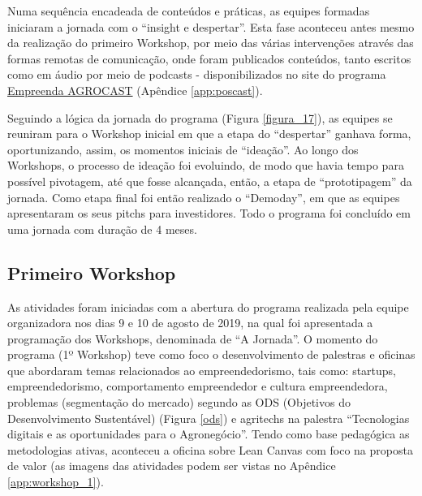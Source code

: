 Numa sequência encadeada de conteúdos e práticas, as equipes formadas iniciaram a jornada com o “insight e despertar”. Esta fase aconteceu antes mesmo da realização do primeiro Workshop, por meio das várias intervenções através das formas remotas de comunicação, onde foram publicados conteúdos, tanto escritos como em áudio por meio de podcasts - disponibilizados no site do programa \href{https://open.spotify.com/show/3c25hRSxvaCFPw6Y3lX3i1?si=9H_fGz_uRgGiFNhAcdr4rQ}{Empreenda AGROCAST} (Apêndice \ref{app:poscast}). 

Seguindo a lógica da jornada do programa (Figura \ref{figura_17}), as equipes se reuniram para o Workshop inicial em que a etapa do “despertar” ganhava forma, oportunizando, assim, os momentos iniciais de “ideação”. Ao longo dos Workshops, o processo de ideação foi evoluindo, de modo que havia tempo para possível pivotagem, até que fosse alcançada, então, a etapa de “prototipagem” da jornada. Como etapa final foi então realizado o “Demoday”, em que as equipes apresentaram os seus pitchs para investidores. Todo o programa foi concluído em uma jornada com duração de 4 meses.

\subsection{Primeiro Workshop}

As atividades foram iniciadas com a abertura do programa realizada pela equipe organizadora nos dias 9 e 10 de agosto de 2019, na qual foi apresentada a programação dos Workshops, denominada de “A Jornada”. O momento do programa (1º Workshop) teve como foco o desenvolvimento de palestras e oficinas que abordaram temas relacionados ao empreendedorismo, tais como: startups, empreendedorismo, comportamento empreendedor e cultura empreendedora, problemas (segmentação do mercado) segundo as ODS (Objetivos do Desenvolvimento Sustentável) (Figura \ref{ods}) e agritechs na palestra “Tecnologias digitais e as oportunidades para o Agronegócio”. Tendo como base pedagógica as metodologias ativas, aconteceu a oficina sobre Lean Canvas com foco na proposta de valor (as imagens das atividades podem ser vistas no Apêndice \ref{app:workshop_1}).

